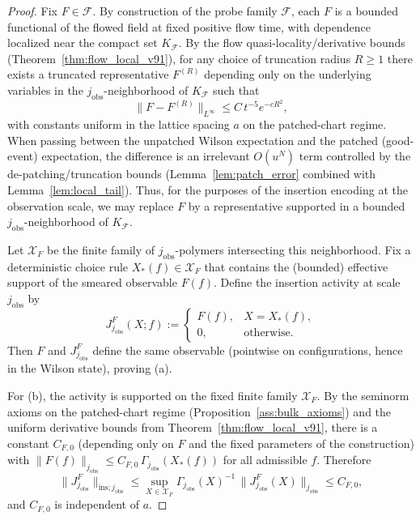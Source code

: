\begin{proof}
Fix $F\in\mathcal F$.
By construction of the probe family $\mathcal F$, each $F$ is a bounded functional of the flowed field at fixed positive flow time,
with dependence localized near the compact set $K_{\mathcal F}$.
By the flow quasi-locality/derivative bounds (Theorem~\ref{thm:flow_local_v91}), for any choice of truncation radius $R\ge 1$
there exists a truncated representative $F^{(R)}$ depending only on the underlying variables in the $j_{\mathrm{obs}}$-neighborhood
of $K_{\mathcal F}$ such that
\[
\|F-F^{(R)}\|_{L^\infty}\le C\,t^{-5}e^{-cR^2},
\]
with constants uniform in the lattice spacing $a$ on the patched-chart regime.
When passing between the unpatched Wilson expectation and the patched (good-event) expectation, the difference is an irrelevant
$O(u^N)$ term controlled by the de-patching/truncation bounds (Lemma~\ref{lem:patch_error} combined with Lemma~\ref{lem:local_tail}).
Thus, for the purposes of the insertion encoding at the observation scale, we may replace $F$ by a representative supported in a bounded
$j_{\mathrm{obs}}$-neighborhood of $K_{\mathcal F}$.

Let $\mathscr X_F$ be the finite family of $j_{\mathrm{obs}}$-polymers intersecting this neighborhood.
Fix a deterministic choice rule $X_\ast(f)\in\mathscr X_F$ that contains the (bounded) effective support of the smeared observable $F(f)$.
Define the insertion activity at scale $j_{\mathrm{obs}}$ by
\[
J^{F}_{j_{\mathrm{obs}}}(X;f):=\begin{cases}
F(f),& X=X_\ast(f),\\
0,& \text{otherwise.}
\end{cases}
\]
Then $F$ and $J^{F}_{j_{\mathrm{obs}}}$ define the same observable (pointwise on configurations, hence in the Wilson state), proving (a).

For (b), the activity is supported on the fixed finite family $\mathscr X_F$.
By the seminorm axioms on the patched-chart regime (Proposition~\ref{ass:bulk_axioms}) and the uniform derivative bounds from
Theorem~\ref{thm:flow_local_v91}, there is a constant $C_{F,0}$ (depending only on $F$ and the fixed parameters of the construction)
with $\|F(f)\|_{j_{\mathrm{obs}}}\le C_{F,0}\,\Gamma_{j_{\mathrm{obs}}}(X_\ast(f))$ for all admissible $f$.
Therefore
\[
\|J^{F}_{j_{\mathrm{obs}}}\|_{\mathrm{ins};j_{\mathrm{obs}}}
\le \sup_{X\in\mathscr X_F}\Gamma_{j_{\mathrm{obs}}}(X)^{-1}\,\|J^{F}_{j_{\mathrm{obs}}}(X)\|_{j_{\mathrm{obs}}}
\le C_{F,0},
\]
and $C_{F,0}$ is independent of $a$.
\end{proof}


